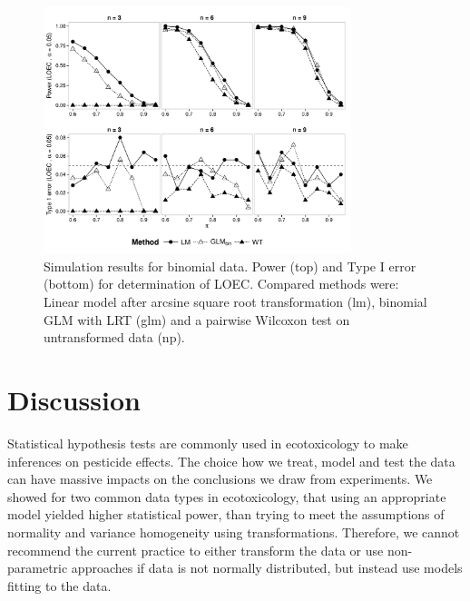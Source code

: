 \documentclass{scrartcl}
\begin{document}
\begin{figure}[h]
  \centering
  \includegraphics[width = 0.8\textwidth]{p_loec_p.pdf}
  \caption{Simulation results for binomial data. Power (top) and Type I error (bottom) for determination of LOEC. Compared methods were: Linear model after arcsine square root transformation (lm), binomial GLM with LRT (glm) and a pairwise Wilcoxon test on untransformed data (np).}
  \label{fig:p_loec_p}
\end{figure}



\section{Discussion}
Statistical hypothesis tests are commonly used in ecotoxicology to make inferences on pesticide effects.
The choice how we treat, model and test the data can have massive impacts on the conclusions we draw from experiments. 
We showed for two common data types in ecotoxicology, that using an appropriate model yielded higher statistical power, than trying to meet the assumptions of normality and variance homogeneity using transformations. 
Therefore, we cannot recommend the current practice to either transform the data or use non-parametric approaches if data is not normally distributed, but instead use models fitting to the data.
\end{document}
